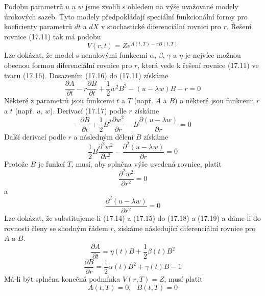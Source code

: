 \documentclass[a4paper]{book}
\begin{document}
Podobu parametrů $u$ a $w$ jsme zvolili s ohledem na výše uvažované modely úrokových sazeb. Tyto modely předpokládají speciální funkcionální formy pro koeficienty parametrů $dt$ a $dX$ v stochastické diferenciální rovnici pro $r$. Řešení rovnice (17.11) tak má podobu
\begin{equation}
V(r,t) = Ze^{A(t,T) - rB(t,T)}
\end{equation}
Lze dokázat, že model s nenulovými funkcemi $\alpha$, $\beta$, $\gamma$ a $\eta$ je nejvíce možnou obecnou formou diferenciální rovnice pro $r$, která vede k řešení rovnice (17.11) ve tvaru (17.16). Dosazením (17.16) do (17.11) získáme
\begin{equation}
\frac{\partial A}{\partial t} - r \frac{\partial B}{\partial t} + \frac{1}{2}w^2B^2 - (u - \lambda w)B - r = 0
\end{equation}
Některé z parametrů jsou funkcemi $t$ a $T$ (např. $A$ a $B$) a některé jsou funkcemi $r$ a $t$ (např. $u$, $w$). Derivací (17.17) podle $r$ získáme
\begin{equation*}
- \frac{\partial B}{\partial t} + \frac{1}{2}B^2\frac{\partial w^2}{\partial r} - B\frac{\partial(u - \lambda w)}{\partial r} = 0
\end{equation*}
Další derivací podle $r$ a následným dělení $B$ získáme
\begin{equation*}
\frac{1}{2}B\frac{\partial^2 w^2}{\partial r^2} - \frac{\partial^2(u - \lambda w)}{\partial r} = 0
\end{equation*}
Protože $B$ je funkcí $T$, musí, aby splněna výše uvedená rovnice, platit
\begin{equation}
\frac{\partial^2 w^2}{\partial r^2} = 0
\end{equation}
a
\begin{equation}
\frac{\partial^2(u - \lambda w)}{\partial r^2} = 0
\end{equation}
Lze dokázat, že substitujeme-li (17.14) a (17.15) do (17.18) a (17.19) a dáme-li do rovnosti členy se shodným řádem $r$, získáme následující diferenciální rovnice pro $A$ a $B$.
\begin{equation}
\frac{\partial A}{\partial t} = \eta(t)B + \frac{1}{2}\beta(t)B^2
\end{equation}
\begin{equation}
\frac{\partial B}{\partial r} = \frac{1}{2} \alpha(t)B^2 + \gamma(t)B - 1
\end{equation}
Má-li být splněna konečná podmínka $V(r,T) = Z$, musí platit
\begin{equation*}
A(t,T) = 0, ~~~ B(t,T) = 0
\end{equation*}
\end{document}
